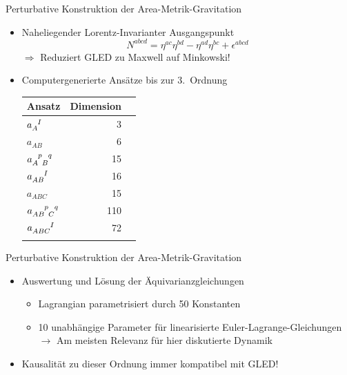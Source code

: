 \documentclass{beamer}
\begin{document}
    \begin{frame}{Perturbative Konstruktion der Area-Metrik-Gravitation}
        \begin{itemize}
            \item Naheliegender Lorentz-Invarianter Ausgangspunkt
            \[
                N^{abcd} = \eta^{ac} \eta^{bd} - \eta^{ad} \eta^{bc} + \epsilon^{abcd}
            \]
            $\Rightarrow$ Reduziert GLED zu Maxwell auf Minkowski!
            \item Computergenerierte Ansätze bis zur 3.\ Ordnung
            \footnotesize
            \begin{table}
                \centering
                \begin{tabular}{l r r}
                    \toprule
                    Ansatz                                            & Dimension \\
                    \midrule
                    $a_A^{\hphantom AI}$                              & 3         \\ \addlinespace[2pt]
                    $a_{AB}$                                          & 6         \\ \addlinespace[2pt]
                    $a_{A\hphantom pB}^{\hphantom Ap\hphantom Bq}$    & 15        \\ \addlinespace[2pt]
                    $a_{AB}^{\hphantom{AB}I}$                         & 16        \\ \addlinespace[2pt]
                    $a_{ABC}$                                         & 15        \\ \addlinespace[2pt]
                    $a_{AB\hphantom pC}^{\hphantom{AB}p\hphantom Cq}$ & 110       \\ \addlinespace[2pt]
                    $a_{ABC}^{\hphantom{ABC}I}$                       & 72        \\ \addlinespace[2pt]
                    \bottomrule
                \end{tabular}\label{tab:ansaetze}
            \end{table}
        \end{itemize}
    \end{frame}

    \begin{frame}{Perturbative Konstruktion der Area-Metrik-Gravitation}
        \begin{itemize}
            \item Auswertung und Lösung der Äquivarianzgleichungen
            \begin{itemize}
                \item Lagrangian parametrisiert durch 50 Konstanten
                \item \alert{10 unabhängige Parameter für linearisierte Euler-Lagrange-Gleichungen} \\
                $\rightarrow$ Am meisten Relevanz für hier diskutierte Dynamik
            \end{itemize}
            \item Kausalität zu dieser Ordnung immer kompatibel mit GLED!
        \end{itemize}
    \end{frame}
\end{document}
